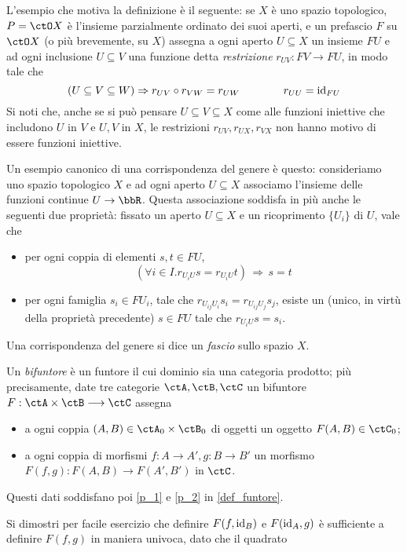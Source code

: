 L'esempio che motiva la definizione è il seguente: se \(X\) è uno spazio topologico, \(P=\ctO X\) è l'insieme parzialmente ordinato dei suoi aperti, e un prefascio \(F\) su \(\ctO X\) (o più brevemente, su \(X\)) assegna a ogni aperto \(U\subseteq X\) un insieme \(FU\) e ad ogni inclusione \(U\subseteq V\) una funzione detta \emph{restrizione} \(r_{UV} : FV \to FU\), in modo tale che
\[(U\subseteq V\subseteq W) \Rightarrow r_{UV}\circ r_{VW} = r_{UW} \qquad\qquad r_{UU} = \mathrm{id}_{FU}\]
Si noti che, anche se si può pensare \(U\subseteq V\subseteq X\) come alle funzioni iniettive che includono \(U\) in \(V\) e \(U,V\) in \(X\), le restrizioni \(r_{UV}, r_{UX}, r_{VX}\) non hanno motivo di essere funzioni iniettive.

Un esempio canonico di una corrispondenza del genere è questo: consideriamo uno spazio topologico \(X\) e ad ogni aperto \(U\subseteq X\) associamo l'insieme delle funzioni continue \(U\to \bbR\). Questa associazione soddisfa in più anche le seguenti due proprietà: fissato un aperto \(U\subseteq X\) e un ricoprimento \(\{U_i\}\) di \(U\), vale che
\begin{itemize}
	\item per ogni coppia di elementi \(s,t \in FU\),
	      \[(\forall i \in I.r_{U_iU}s = r_{U_iU} t) \,\Rightarrow\, s=t\]
	\item per ogni famiglia \(s_i \in FU_i\), tale che \(r_{U_{ij}U_i}s_i = r_{U_{ij}U_j}s_j\), esiste un (unico, in virtù della proprietà precedente) \(s\in FU\) tale che \(r_{U_iU}s=s_i\).
\end{itemize}
Una corrispondenza del genere si dice un \emph{fascio} sullo spazio \(X\).
\begin{definition}
	Un \emph{bifuntore} è un funtore il cui dominio sia una categoria prodotto; più precisamente, date tre categorie \(\ctA,\ctB,\ctC\) un bifuntore \(F : \ctA \times \ctB \fun \ctC\) assegna
	\begin{itemize}
		\item a ogni coppia \((A,B)\in \ctA_0\times\ctB_0\) di oggetti un oggetto \(F(A,B) \in\ctC_0\);
		\item a ogni coppia di morfismi \(f : A\to A', g : B\to B'\) un morfismo \(F(f,g) : F(A,B)\to F(A',B')\) in \(\ctC\).
	\end{itemize}
	Questi dati soddisfano poi \ref{p_1} e \ref{p_2} in \ref{def_funtore}.
\end{definition}
Si dimostri per facile esercizio che definire \(F(f,\mathrm{id}_B)\) e \(F(\mathrm{id}_A,g)\) è sufficiente a definire \(F(f,g)\) in maniera univoca, dato che il quadrato

